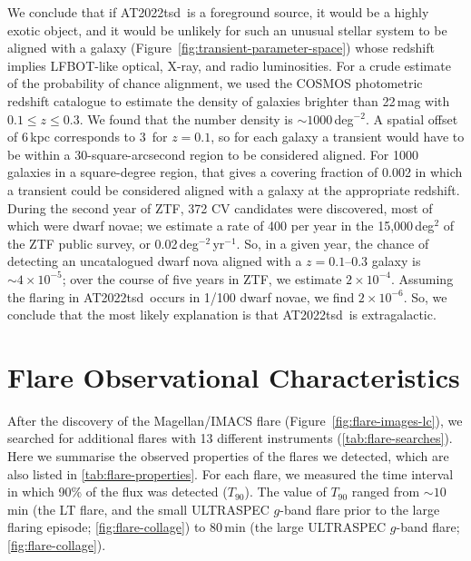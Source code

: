 \documentclass{nature_plusfigure}
\newcommand{\at}{AT2022tsd}
\begin{document}
\begin{methods}
We conclude that if \at\ is a foreground source, it would be a highly exotic object, and it would be unlikely for such an unusual stellar system to be aligned with a galaxy (Figure~\ref{fig:transient-parameter-space}) whose redshift implies LFBOT-like optical, X-ray, and radio luminosities.
For a crude estimate of the probability of chance alignment, we used the COSMOS photometric redshift catalogue\cite{Ilbert2008} to estimate the density of galaxies brighter than 22\,mag with $0.1 \leq z \leq 0.3$. We found that the number density is $\sim 1000$\,deg$^{-2}$.
A spatial offset of 6\,kpc corresponds to 3\arcsec\ for $z=0.1$, so for each galaxy a transient would have to be within a 30-square-arcsecond region to be considered aligned. For 1000 galaxies in a square-degree region, that gives a covering fraction of 0.002 in which a transient could be considered aligned with a galaxy at the appropriate redshift.
During the second year of ZTF, 372 CV candidates were discovered\cite{Szkody2021}, most of which were dwarf novae; we estimate a rate of 400 per year in the 15,000\,deg$^{2}$ of the ZTF public survey, or 0.02\,deg$^{-2}$\,yr$^{-1}$. So, in a given year, the chance of detecting an uncatalogued dwarf nova aligned with a $z=0.1$--0.3 galaxy is $\sim 4\times10^{-5}$; over the course of five years in ZTF, we estimate $2\times10^{-4}$. Assuming the flaring in \at\ occurs in 1/100 dwarf novae, we find $2\times10^{-6}$.
So, we conclude that the most likely explanation is that \at\ is extragalactic.

\section{Flare Observational Characteristics}
\label{sec:flare-characteristics}

After the discovery of the Magellan/IMACS flare (Figure~\ref{fig:flare-images-lc}), we searched for additional flares with 13 different instruments (\ref{tab:flare-searches}). Here we summarise the observed properties of the flares we detected, which are also listed in \ref{tab:flare-properties}. For each flare, we measured the time interval in which 90\% of the flux was detected ($T_{90}$). The value of $T_{90}$ ranged from $\sim10$\,min (the LT flare, and the small ULTRASPEC $g$-band flare prior to the large flaring episode; \ref{fig:flare-collage}) to 80\,min (the large ULTRASPEC $g$-band flare; \ref{fig:flare-collage}). 


\end{methods}
\end{document}
